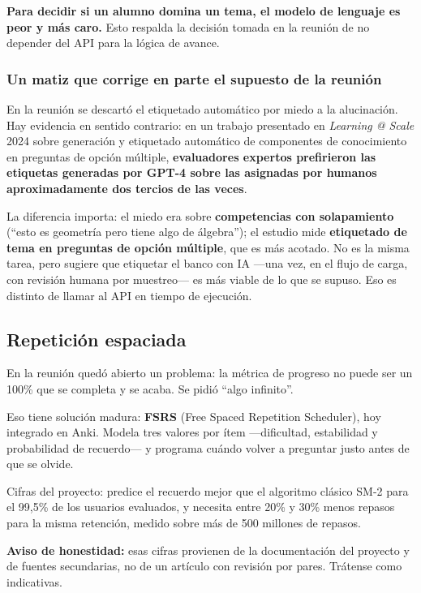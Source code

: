 \documentclass[11pt,a4paper]{article}
\begin{document}
\textbf{Para decidir si un alumno domina un tema, el modelo de lenguaje es peor y más caro.} Esto respalda la decisión tomada en la reunión de no depender del API para la lógica de avance.

\subsubsection{Un matiz que corrige en parte el supuesto de la reunión}

En la reunión se descartó el etiquetado automático por miedo a la alucinación. Hay evidencia en sentido contrario: en un trabajo presentado en \emph{Learning @ Scale} 2024 sobre generación y etiquetado automático de componentes de conocimiento en preguntas de opción múltiple, \textbf{evaluadores expertos prefirieron las etiquetas generadas por GPT-4 sobre las asignadas por humanos aproximadamente dos tercios de las veces}.

La diferencia importa: el miedo era sobre \textbf{competencias con solapamiento} (``esto es geometría pero tiene algo de álgebra''); el estudio mide \textbf{etiquetado de tema en preguntas de opción múltiple}, que es más acotado. No es la misma tarea, pero sugiere que etiquetar el banco con IA ---una vez, en el flujo de carga, con revisión humana por muestreo--- es más viable de lo que se supuso. Eso es distinto de llamar al API en tiempo de ejecución.

\subsection{Repetición espaciada}

En la reunión quedó abierto un problema: la métrica de progreso no puede ser un 100\% que se completa y se acaba. Se pidió ``algo infinito''.

Eso tiene solución madura: \textbf{FSRS} (Free Spaced Repetition Scheduler), hoy integrado en Anki. Modela tres valores por ítem ---dificultad, estabilidad y probabilidad de recuerdo--- y programa cuándo volver a preguntar justo antes de que se olvide.

Cifras del proyecto: predice el recuerdo mejor que el algoritmo clásico SM-2 para el 99{,}5\% de los usuarios evaluados, y necesita entre 20\% y 30\% menos repasos para la misma retención, medido sobre más de 500 millones de repasos.

{\small\textbf{Aviso de honestidad:} esas cifras provienen de la documentación del proyecto y de fuentes secundarias, no de un artículo con revisión por pares. Trátense como indicativas.}
\end{document}
